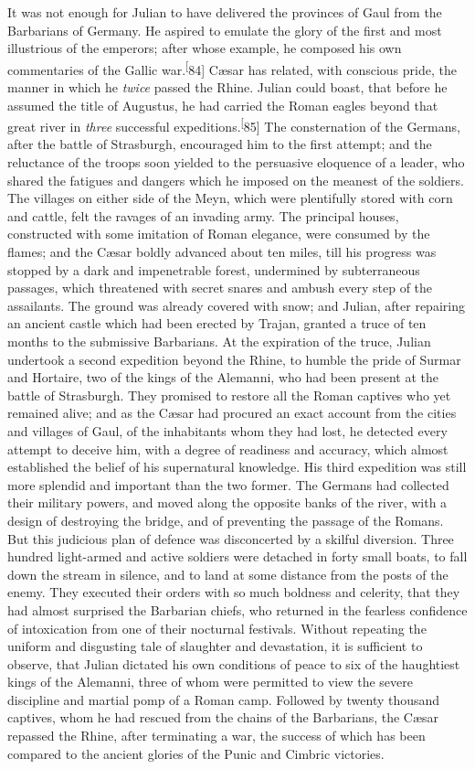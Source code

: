 It was not enough for Julian to have delivered the provinces of
Gaul from the Barbarians of Germany. He aspired to emulate the
glory of the first and most illustrious of the emperors; after
whose example, he composed his own commentaries of the Gallic
war.\textsuperscript[84] Cæsar has related, with conscious pride, the manner in
which he \textit{twice} passed the Rhine. Julian could boast, that
before he assumed the title of Augustus, he had carried the Roman
eagles beyond that great river in \textit{three} successful expeditions.\textsuperscript[85]
The consternation of the Germans, after the battle of
Strasburgh, encouraged him to the first attempt; and the
reluctance of the troops soon yielded to the persuasive eloquence
of a leader, who shared the fatigues and dangers which he imposed
on the meanest of the soldiers. The villages on either side of
the Meyn, which were plentifully stored with corn and cattle,
felt the ravages of an invading army. The principal houses,
constructed with some imitation of Roman elegance, were consumed
by the flames; and the Cæsar boldly advanced about ten miles,
till his progress was stopped by a dark and impenetrable forest,
undermined by subterraneous passages, which threatened with
secret snares and ambush every step of the assailants. The ground
was already covered with snow; and Julian, after repairing an
ancient castle which had been erected by Trajan, granted a truce
of ten months to the submissive Barbarians. At the expiration of
the truce, Julian undertook a second expedition beyond the Rhine,
to humble the pride of Surmar and Hortaire, two of the kings of
the Alemanni, who had been present at the battle of Strasburgh.
They promised to restore all the Roman captives who yet remained
alive; and as the Cæsar had procured an exact account from the
cities and villages of Gaul, of the inhabitants whom they had
lost, he detected every attempt to deceive him, with a degree of
readiness and accuracy, which almost established the belief of
his supernatural knowledge. His third expedition was still more
splendid and important than the two former. The Germans had
collected their military powers, and moved along the opposite
banks of the river, with a design of destroying the bridge, and
of preventing the passage of the Romans. But this judicious plan
of defence was disconcerted by a skilful diversion. Three hundred
light-armed and active soldiers were detached in forty small
boats, to fall down the stream in silence, and to land at some
distance from the posts of the enemy. They executed their orders
with so much boldness and celerity, that they had almost
surprised the Barbarian chiefs, who returned in the fearless
confidence of intoxication from one of their nocturnal festivals.
Without repeating the uniform and disgusting tale of slaughter
and devastation, it is sufficient to observe, that Julian
dictated his own conditions of peace to six of the haughtiest
kings of the Alemanni, three of whom were permitted to view the
severe discipline and martial pomp of a Roman camp. Followed by
twenty thousand captives, whom he had rescued from the chains of
the Barbarians, the Cæsar repassed the Rhine, after terminating a
war, the success of which has been compared to the ancient
glories of the Punic and Cimbric victories.

